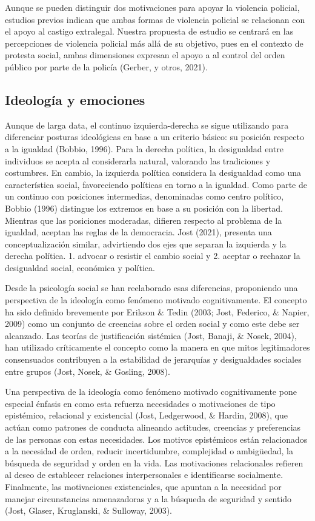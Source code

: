 \documentclass[12pt,twoside]{templates/facsothesis}
\begin{document}
Aunque se pueden distinguir dos motivaciones para apoyar la violencia policial, estudios previos indican que ambas formas de violencia policial se relacionan con el apoyo al castigo extralegal. Nuestra propuesta de estudio se centrará en las percepciones de violencia policial más allá de su objetivo, pues en el contexto de protesta social, ambas dimensiones expresan el apoyo a al control del orden público por parte de la policía (Gerber, y otros, 2021).

\hypertarget{ideologuxeda-y-emociones}{%
\subsection{Ideología y emociones}\label{ideologuxeda-y-emociones}}

Aunque de larga data, el continuo izquierda-derecha se sigue utilizando para diferenciar posturas ideológicas en base a un criterio básico: su posición respecto a la igualdad (Bobbio, 1996). Para la derecha política, la desigualdad entre individuos se acepta al considerarla natural, valorando las tradiciones y costumbres. En cambio, la izquierda política considera la desigualdad como una característica social, favoreciendo políticas en torno a la igualdad. Como parte de un continuo con posiciones intermedias, denominadas como centro político, Bobbio (1996) distingue los extremos en base a su posición con la libertad. Mientras que las posiciones moderadas, difieren respecto al problema de la igualdad, aceptan las reglas de la democracia. Jost (2021), presenta una conceptualización similar, advirtiendo dos ejes que separan la izquierda y la derecha política. 1. advocar o resistir el cambio social y 2. aceptar o rechazar la desigualdad social, económica y política.

Desde la psicología social se han reelaborado esas diferencias, proponiendo una perspectiva de la ideología como fenómeno motivado cognitivamente. El concepto ha sido definido brevemente por Erikson \& Tedin (2003; Jost, Federico, \& Napier, 2009) como un conjunto de creencias sobre el orden social y como este debe ser alcanzado. Las teorías de justificación sistémica (Jost, Banaji, \& Nosek, 2004), han utilizado críticamente el concepto como la manera en que mitos legitimadores consensuados contribuyen a la estabilidad de jerarquías y desigualdades sociales entre grupos (Jost, Nosek, \& Gosling, 2008).

Una perspectiva de la ideología como fenómeno motivado cognitivamente pone especial énfasis en como esta refuerza necesidades o motivaciones de tipo epistémico, relacional y existencial (Jost, Ledgerwood, \& Hardin, 2008), que actúan como patrones de conducta alineando actitudes, creencias y preferencias de las personas con estas necesidades. Los motivos epistémicos están relacionados a la necesidad de orden, reducir incertidumbre, complejidad o ambigüedad, la búsqueda de seguridad y orden en la vida. Las motivaciones relacionales refieren al deseo de establecer relaciones interpersonales e identificarse socialmente. Finalmente, las motivaciones existenciales, que apuntan a la necesidad por manejar circunstancias amenazadoras y a la búsqueda de seguridad y sentido (Jost, Glaser, Kruglanski, \& Sulloway, 2003).
\end{document}
